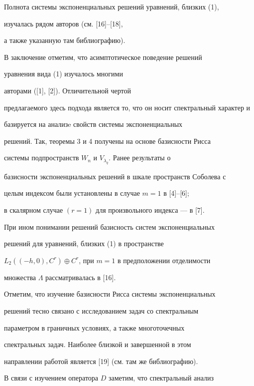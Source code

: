 Полнота системы экспоненциальных решений уравнений, близких (1),


изучалась рядом авторов (см. [16]--[18],


а также указанную там библиографию).





В заключение отметим, что асимптотическое поведение решений


уравнения вида (1) изучалось многими


авторами ([1], [2]). Отличительной чертой


предлагаемого здесь подхода является то, что он носит спектральный характер и


базируется на анализe свойств системы экспоненциальных


решений. Так, теоремы 3 и 4 получены на основе базисности Рисса


системы подпространств $W_n$ и $V_{\lambda_q}$. Ранее результаты о


базисности экспоненциальных решений в шкале пространств Соболева с


целым индексом были установлены в случае $m=1$ в [4]--[6];


в скалярном случае $(r=1)$ для произвольного индекса --- в [7].





При ином понимании решений базисность систем экспоненциальных


решений для уравнений, близких (1) в пространстве


$L_2((-h,0),C^r)\oplus C^r$,  при $m=1$ в предположении отделимости


множества $\Lambda$ рассматривалась в [16].





Отметим, что изучение базисности Рисса системы экспоненциальных


решений тесно связано с исследованием задач со спектральным


параметром в граничных условиях, а также многоточечных


спектральных задач. Наиболее близкой и завершенной в этом


направлении  работой является [19] (см. там же библиографию).





В связи с изучением оператора $D$ заметим, что спектральный анализ


